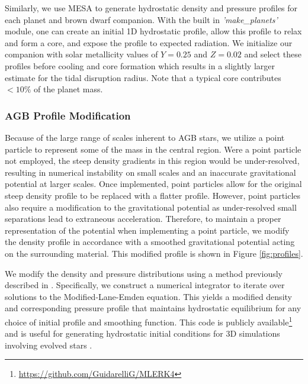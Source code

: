 \documentclass[fleqn,usenatbib]{mnras}
\begin{document}
Similarly, we use {\sc MESA} to generate hydrostatic density and pressure profiles for each planet and brown dwarf companion. With the built in \textit{'make\_planets'} module, one can create an initial 1D hydrostatic profile, allow this profile to relax and form a core, and expose the profile to expected radiation. We initialize our companion with solar metallicity values of $Y = 0.25$ and $Z = 0.02$ and select these profiles before cooling and core formation which results in a slightly larger estimate for the tidal disruption radius. Note that a typical core contributes $<10\%$ of the planet mass. 



\subsubsection{AGB Profile Modification}

Because of the large range of scales inherent to AGB stars, we utilize a point particle to represent some of the mass in the central region. Were a point particle  not employed, the steep density gradients in this region would be under-resolved, resulting in numerical instability on small scales and an inaccurate gravitational potential at larger scales. Once implemented, point particles allow for the original steep density profile to be replaced with a flatter profile. However, point particles also require a modification to the gravitational potential as under-resolved small separations lead to extraneous acceleration. Therefore, to maintain a proper representation of the potential when implementing a point particle, we modify the density 
profile in accordance with a smoothed gravitational potential  acting on the surrounding material. This modified profile is shown in Figure \ref{fig:profiles}. 

We modify the density and pressure distributions using a method previously described in \cite{Guidarelli2019}. Specifically, we construct a numerical integrator to iterate over solutions to the Modified-Lane-Emden equation. This yields a modified density and corresponding pressure profile that maintains hydrostatic equilibrium for any choice of initial profile and smoothing function.  This code is publicly available\footnote{\url{https://github.com/GuidarelliG/MLERK4}} and is useful for generating hydrostatic initial conditions for 3D simulations involving evolved stars \citep{Guidarelli2019, Ohlmann2017,Chamandy:2018aa}.
\end{document}
